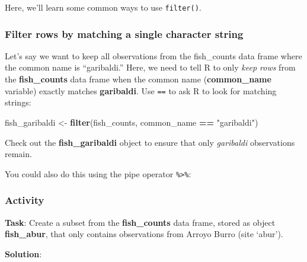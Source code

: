 \documentclass[]{book}
\newenvironment{Shaded}{\begin{snugshade}}{\end{snugshade}}
\newcommand{\KeywordTok}[1]{\textcolor[rgb]{0.13,0.29,0.53}{\textbf{#1}}}
\newcommand{\NormalTok}[1]{#1}
\newcommand{\OperatorTok}[1]{\textcolor[rgb]{0.81,0.36,0.00}{\textbf{#1}}}
\newcommand{\StringTok}[1]{\textcolor[rgb]{0.31,0.60,0.02}{#1}}
\begin{document}
Here, we'll learn some common ways to use \texttt{filter()}.

\hypertarget{filter-rows-by-matching-a-single-character-string}{%
\subsubsection{Filter rows by matching a single character string}\label{filter-rows-by-matching-a-single-character-string}}

Let's say we want to keep all observations from the fish\_counts data frame where the common name is ``garibaldi.'' Here, we need to tell R to only \emph{keep rows} from the \textbf{fish\_counts} data frame when the common name (\textbf{common\_name} variable) exactly matches \textbf{garibaldi}.
Use \texttt{==} to ask R to look for matching strings:

\begin{Shaded}
\begin{Highlighting}[]
\NormalTok{fish_garibaldi <-}\StringTok{ }\KeywordTok{filter}\NormalTok{(fish_counts, common_name }\OperatorTok{==}\StringTok{ "garibaldi"}\NormalTok{)}
\end{Highlighting}
\end{Shaded}

Check out the \textbf{fish\_garibaldi} object to ensure that only \emph{garibaldi} observations remain.

You could also do this using the pipe operator \texttt{\%\textgreater{}\%}:

\begin{Shaded}
\end{Shaded}

\hypertarget{activity-4}{%
\subsubsection{Activity}\label{activity-4}}

\textbf{Task}: Create a subset from the \textbf{fish\_counts} data frame, stored as object \textbf{fish\_abur}, that only contains observations from Arroyo Burro (site `abur').

\textbf{Solution}:
\end{document}
